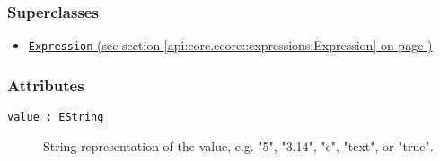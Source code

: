\subsubsection*{Superclasses}
\begin{itemize}
\item \hyperref[api:core.ecore::expressions:Expression]{\texttt{Expression} (see section \ref*{api:core.ecore::expressions:Expression} on page \pageref*{api:core.ecore::expressions:Expression})}
\end{itemize}
\subsubsection*{Attributes}
\begin{description}
\item[\texttt{value~:~EString}] String representation of the value, e.g. "5", "3.14", "c", "text", or "true".
\end{description}


